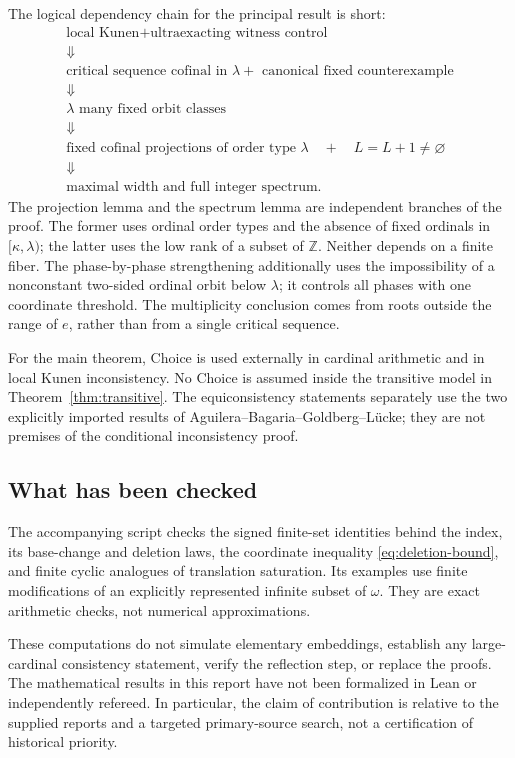 \documentclass[11pt,letterpaper]{article}
\theoremstyle{definition}
\numberwithin{equation}{section}
\newcommand{\ZZ}{\mathbb Z}
\begin{document}
The logical dependency chain for the principal result is short:
\[
\begin{gathered}
\text{local Kunen} + \text{ultraexacting witness control}\\
\Downarrow\\
\text{critical sequence cofinal in }\lambda
 +\text{ canonical fixed counterexample}\\
\Downarrow\\
\lambda\text{ many fixed orbit classes}\\
\Downarrow\\
\text{fixed cofinal projections of order type }\lambda
\quad+\quad L=L+1\ne\varnothing\\
\Downarrow\\
\text{maximal width and full integer spectrum.}
\end{gathered}
\]
The projection lemma and the spectrum lemma are independent branches of the proof. The former uses ordinal order types and the absence of fixed ordinals in $[\kappa,\lambda)$; the latter uses the low rank of a subset of $\ZZ$. Neither depends on a finite fiber. The phase-by-phase strengthening additionally uses the impossibility of a nonconstant two-sided ordinal orbit below $\lambda$; it controls all phases with one coordinate threshold. The multiplicity conclusion comes from roots outside the range of $e$, rather than from a single critical sequence.

For the main theorem, Choice is used externally in cardinal arithmetic and in local Kunen inconsistency. No Choice is assumed inside the transitive model in Theorem~\ref{thm:transitive}. The equiconsistency statements separately use the two explicitly imported results of Aguilera--Bagaria--Goldberg--L\"ucke; they are not premises of the conditional inconsistency proof.

\subsection{What has been checked}

The accompanying script checks the signed finite-set identities behind the index, its base-change and deletion laws, the coordinate inequality \eqref{eq:deletion-bound}, and finite cyclic analogues of translation saturation. Its examples use finite modifications of an explicitly represented infinite subset of $\omega$. They are exact arithmetic checks, not numerical approximations.

These computations do not simulate elementary embeddings, establish any large-cardinal consistency statement, verify the reflection step, or replace the proofs. The mathematical results in this report have not been formalized in Lean or independently refereed. In particular, the claim of contribution is relative to the supplied reports and a targeted primary-source search, not a certification of historical priority.
\end{document}
